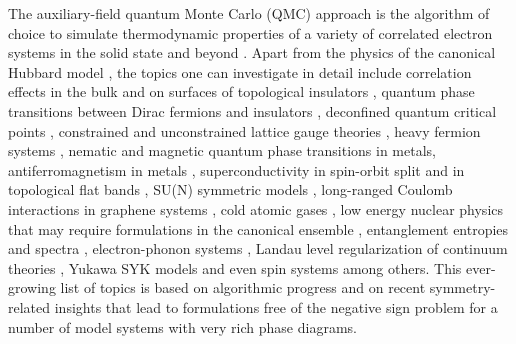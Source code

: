 The auxiliary-field quantum Monte Carlo (QMC) approach is the algorithm of choice to simulate  thermodynamic properties of a variety of correlated electron systems in the solid state and beyond \cite{Blankenbecler81,White89,Sugiyama86,Sorella89, Duane87, Assaad08_rev}.  
Apart from the physics of the  canonical Hubbard model 
\cite{Scalapino07,LeBlanc15},   the topics one can investigate in detail include correlation effects in the bulk and on surfaces of topological insulators \cite{Hohenadler10,Zheng11,Assaad12,Hofmann19}, quantum phase transitions between  Dirac fermions  and insulators \cite{Assaad13,Toldin14,Otsuka16,Chandrasekharan13,Chandrasekharan15,Liu18,Li17,Raczkowski2019},  
deconfined quantum critical points 
\cite{Assaad16,SatoT17,Liu18,Sato20,Wang20},  constrained and unconstrained lattice gauge theories \cite{Assaad16,Gazit16,Gazit18,Xu18,Hohenadler18,Hohenadler19,Gazit19}, heavy fermion systems \cite{Assaad99a,Capponi00,SatoT17_1,Hofmann18,Danu19,Danu20}, nematic \cite{Schattner15,Grossman20} and magnetic  \cite{Xu16c,LiuZH19} quantum phase transitions in metals, antiferromagnetism in metals \cite{Berg12},    superconductivity in spin-orbit split and in topological flat bands \cite{Tang14_1,Hofmann20, Peri20}, SU(N) symmetric models \cite{Assaad04,Lang13,Kim_F17,WangD14,Kim_F18,Raczkowski20},  long-ranged Coulomb interactions in graphene systems \cite{Hohenadler14,Tang15,Tang17,Raczkowski17,Leaw19},  cold atomic gases  \cite{Rigol03},   low energy nuclear physics \cite{Lee09}   that may require formulations in the canonical ensemble \cite{WangZ17,Shen20},   entanglement entropies and spectra \cite{Grover13,Broecker14,Assaad13a,Assaad15,Toldin18,Toldin18_1,ParisenToldin19},  electron-phonon systems \cite{Chen18,Chen19,Bradley20},  Landau level  regularization of continuum theories \cite{Ippoliti18,WangZ20},     Yukawa SYK models \cite{Pan20}    and even spin systems \cite{HZhang20} among others. 
This ever-growing list of topics is based on algorithmic progress and on recent symmetry-related insights  \cite{Wu04,Huffman14,Yao14a,Wei16} that lead to formulations free of the negative sign problem for a number of model systems with very rich phase diagrams.




